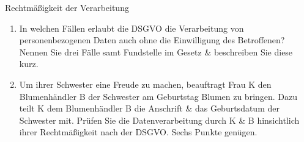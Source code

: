 \documentclass{article}
\begin{document}
\begin{exercise}{Rechtmäßigkeit der Verarbeitung}
  \begin{enumerate}
    \item In welchen Fällen erlaubt die DSGVO die Verarbeitung von personenbezogenen Daten auch ohne die Einwilligung des Betroffenen? Nennen Sie drei Fälle samt Fundstelle im Gesetz \& beschreiben Sie diese kurz.
    \item Um ihrer Schwester eine Freude zu machen, beauftragt Frau K den Blumenhändler B der Schwester am Geburtstag Blumen zu bringen. Dazu teilt K dem Blumenhändler B die Anschrift \& das Geburtsdatum der Schwester mit. Prüfen Sie die Datenverarbeitung durch K \& B hinsichtlich ihrer Rechtmäßigkeit nach der DSGVO. Sechs Punkte genügen.
  \end{enumerate}


\end{exercise}
\end{document}

